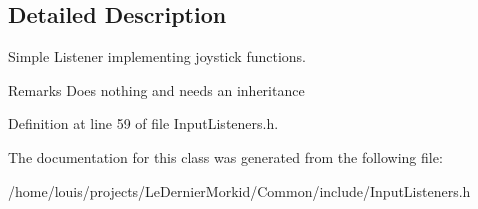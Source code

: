 \subsection{Detailed Description}
Simple Listener implementing joystick functions. 

\begin{DoxyRemark}{Remarks}
Does nothing and needs an inheritance 
\end{DoxyRemark}


Definition at line 59 of file Input\+Listeners.\+h.



The documentation for this class was generated from the following file\+:\begin{DoxyCompactItemize}
\item 
/home/louis/projects/\+Le\+Dernier\+Morkid/\+Common/include/Input\+Listeners.\+h\end{DoxyCompactItemize}
